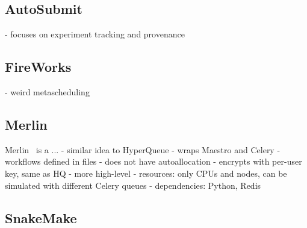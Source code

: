 
\subsection*{AutoSubmit}

- focuses on experiment tracking and provenance

\subsection*{FireWorks}


- weird metascheduling

\subsection*{Merlin}
Merlin~\cite{merlin} is a ...  - similar idea to%
HyperQueue
- wraps Maestro and Celery
- workflows defined in files
- does not have autoallocation
- encrypts with per-user key, same as HQ
- more high-level
- resources: only CPUs and nodes, can be simulated with different Celery queues
- dependencies: Python, Redis


\subsection*{SnakeMake}

